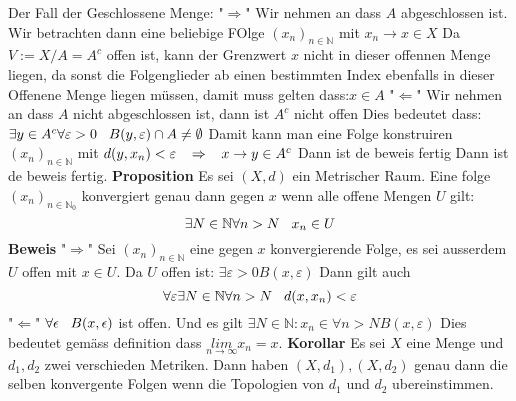 \documentclass{article}
\newcommand{\mspc}{\hspace{0.3cm}}
\begin{document}
Der Fall der Geschlossene Menge:\newline
"$\Rightarrow$" Wir nehmen an dass $A$ abgeschlossen ist. Wir betrachten dann eine beliebige FOlge $(x_n)_{n\in\mathbb{N}}$ mit $x_n\rightarrow x\in X$ Da $V:=X/A=A^c$ offen ist, kann der Grenzwert $x$ nicht in dieser offennen Menge liegen, da sonst die Folgenglieder ab einen bestimmten Index ebenfalls in dieser Offenene Menge liegen müssen, damit muss gelten dass:$x\in A$\newline
"$\Leftarrow$" Wir nehmen an dass $A$ nicht abgeschlossen ist, dann ist $A^c$ nicht offen Dies bedeutet dass: $\exists y\in A^c \forall \varepsilon>0 \mspc B(y,\varepsilon) \cap A \neq \emptyset$ Damit kann man eine Folge konstruiren 
$(x_n)_{n\in\mathbb{N}}$ mit $d(y,x_n)<\varepsilon \mspc \Rightarrow\mspc x\rightarrow y\in A^c$ Dann ist de beweis fertig Dann ist de beweis fertig.\newline
\noindent
\textbf{Proposition} Es sei $(X,d)$ ein Metrischer Raum. Eine folge $(x_n)_{n\in\mathbb{N}_0}$ konvergiert genau dann gegen $x$ wenn alle offene Mengen $U$ gilt:\[\exists N\in \mathbb{N}\forall n>N\mspc x_n\in U\]\newline
\textbf{Beweis}
"$\Rightarrow$" Sei $(x_n)_{n\in\mathbb{N}}$ eine gegen $x$ konvergierende Folge, es sei ausserdem $U$ offen mit $x\in U$. Da $U$ offen ist: $\exists \varepsilon >0 B(x,\varepsilon)$ Dann gilt auch \[\forall \varepsilon \exists N\in\mathbb{N} \forall n>N \mspc d(x,x_n)<\varepsilon\]
\newline
"$\Leftarrow$" $\forall \epsilon \mspc B(x, \epsilon)$ ist offen. Und es gilt $\exists N\in\mathbb{N} : x_n\in\forall n>N B(x, \varepsilon)$ Dies bedeutet gemäss definition dass $\underset{n\rightarrow\infty}{lim} x_n=x$. \newline
\textbf{Korollar} Es sei $X$ eine Menge und $d_1, d_2$ zwei verschieden Metriken. Dann haben $(X,d_1), (X, d_2)$ genau dann die selben konvergente Folgen wenn die Topologien von $d_1$ und $d_2$ ubereinstimmen. 
\newline
\end{document}
